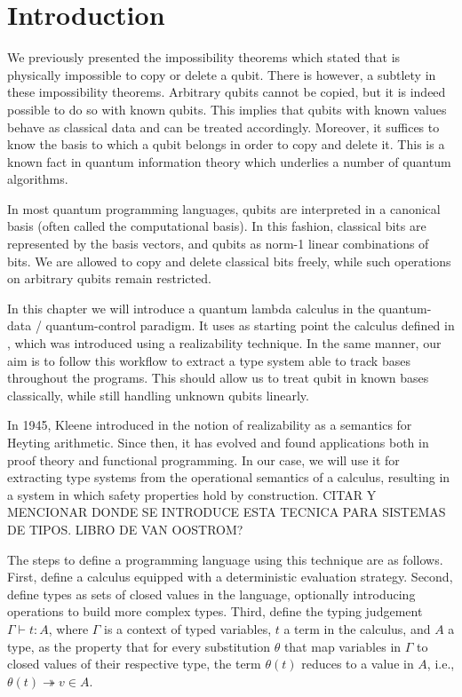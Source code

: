 \section{Introduction}

We previously presented the impossibility theorems which stated that is physically impossible to copy or delete a qubit. There is however, a subtlety in these impossibility theorems. Arbitrary qubits cannot be copied, but it is indeed possible to do so with known qubits. This implies that qubits with known values behave as classical data and can be treated accordingly. Moreover, it suffices to know the basis to which a qubit belongs in order to copy and delete it. This is a known fact in quantum information theory which underlies a number of quantum algorithms. 

In most quantum programming languages, qubits are interpreted in a canonical basis (often called the computational basis). In this fashion, classical bits are represented by the basis vectors, and qubits as norm-1 linear combinations of bits. We are allowed to copy and delete classical bits freely, while such operations on arbitrary qubits remain restricted.

In this chapter we will introduce a quantum lambda calculus in the quantum-data / quantum-control paradigm. It uses as starting point the calculus defined in \cite{DiazcaroGuillermoMiquelValironLICS19}, which was introduced using a realizability technique. In the same manner, our aim is to follow this workflow to extract a type system able to track bases throughout the programs. This should allow us to treat qubit in known bases classically, while still handling unknown qubits linearly.


In 1945, Kleene introduced in \cite{KleeneJSL45} the notion of realizability as a semantics for Heyting arithmetic. Since then, it has evolved and found applications both in proof theory and functional programming. In our case, we will use it for extracting type systems from the operational semantics of a calculus, resulting in a system in which safety properties hold by construction.{\color{red} CITAR Y MENCIONAR DONDE SE INTRODUCE ESTA TECNICA PARA SISTEMAS DE TIPOS. LIBRO DE VAN OOSTROM?}

The steps to define a programming language using this technique are as follows. First, define a calculus equipped with a deterministic evaluation strategy. Second, define types as sets of closed values in the language, optionally introducing operations to build more complex types. Third, define the typing judgement $\Gamma \vdash t : A$, where $\Gamma$ is a context of typed variables, $t$ a term in the calculus, and $A$ a type, as the property that for every substitution $\theta$ that map variables in $\Gamma$ to closed values of their respective type, the term $\theta(t)$ reduces to a value in $A$, i.e., $\theta(t) \twoheadrightarrow v \in A$.

